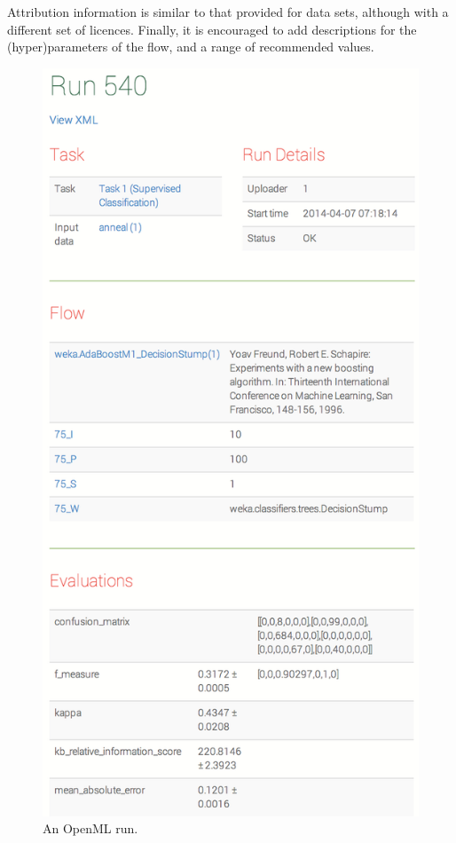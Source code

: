 \documentclass{acmproc-sp}
\begin{document}
Attribution information is similar to that provided for data sets, although with a different set of licences. Finally, it is encouraged to add descriptions for the (hyper)parameters of the flow, and a range of recommended values.

\begin{figure}[!t]
\centering
\includegraphics[width=\columnwidth]{openml-run.png}
\caption{\label{fig:run}An OpenML run.}
\end{figure}
\end{document}
